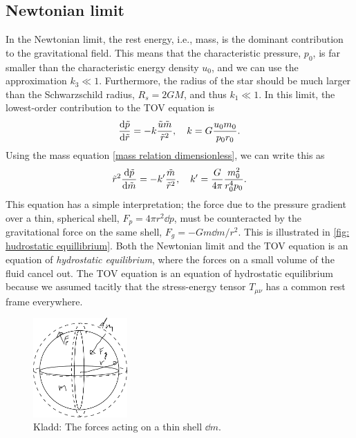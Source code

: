 \subsection*{Newtonian limit}

In the Newtonian limit, the rest energy, i.e., mass, is the dominant contribution to the gravitational field.
This means that the characteristic pressure, $p_0$, is far smaller than the characteristic energy density $u_0$, and we can use the approximation $k_3 \ll 1$.
Furthermore, the radius of the star should be much larger than the Schwarzschild radius, $R_s = 2 G M$, and thus $ k_1 \ll 1$.
In this limit, the lowest-order contribution to the TOV equation is
%
\begin{equation}
    \label{Newtonian limit TOV}
    \diff{\tilde p}{\tilde r} = - k \frac{\tilde u \tilde m}{\tilde r^2}, \quad
    k = G \frac{u_0 m_0}{p_0 r_0}.
\end{equation}
%
Using the mass equation \autoref{mass relation dimensionless}, we can write this as
%
\begin{equation}
    \tilde r^2 \diff{\tilde p}{\tilde m}
    = - k' \frac{\tilde m}{\tilde r^2}, 
    \quad k' = \frac{G}{4 \pi } \frac{m_0^2}{r_0^4 p_0}.
\end{equation}
%
This equation has a simple interpretation; the force due to the pressure gradient over a thin, spherical shell, $F_p = 4 \pi r^2 \dd p$, must be counteracted by the gravitational force on the same shell, $F_g = - G m \dd m / r^2$.
This is illustrated in \autoref{fig: hudrostatic equillibrium}.
Both the Newtonian limit and the TOV equation is an equation of \emph{hydrostatic equilibrium}, where the forces on a small volume of the fluid cancel out.
The TOV equation is an equation of hydrostatic equilibrium because we assumed tacitly that the stress-energy tensor $T_{\mu \nu}$ has a common rest frame everywhere.

\begin{figure}[h]
    \centering
    \includegraphics[width=0.32\textwidth]{figurer/hydrostatic_equillibrium.pdf}
    \caption{Kladd: The forces acting on a thin shell $\dd m$.}
    \label{fig: hudrostatic equillibrium}
\end{figure}


